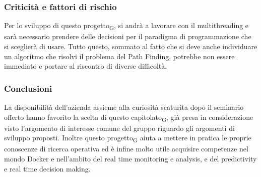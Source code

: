 \subsubsection{Criticità e fattori di rischio}
Per lo sviluppo di questo progetto\textsubscript{G}, si andrà a lavorare con il multithreading e sarà necessario prendere delle decisioni per il paradigma di programmazione che si sceglierà di usare. 
Tutto questo, sommato al fatto che si deve anche individuare un algoritmo che risolvi il problema del Path Finding, potrebbe non essere immediato e portare al riscontro di diverse difficoltà.
\subsubsection{Conclusioni}
La disponibilità dell'azienda assieme alla curiosità scaturita dopo il seminario offerto hanno favorito la scelta di questo capitolato\textsubscript{G}, già presa in considerazione visto l'argomento di interesse comune del gruppo riguardo gli argomenti di sviluppo proposti.
Inoltre questo progetto\textsubscript{G} aiuta a mettere in pratica le proprie conoscenze di ricerca operativa ed è infine molto utile acquisire competenze nel mondo Docker e nell'ambito del real time monitoring e analysis, e del predictivity e real time decision making.